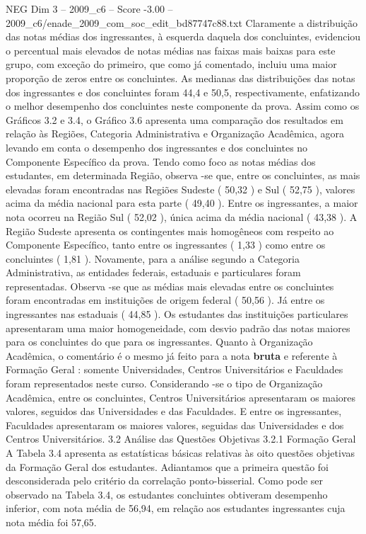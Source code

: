\begin{textsample}{NEG Dim 3 – 2009\_c6 – Score -3.00 – 2009\_c6/enade\_2009\_com\_soc\_edit\_bd87747c88.txt}
Claramente a distribuição das notas médias dos ingressantes, à esquerda daquela dos concluintes, evidenciou o percentual mais elevados de notas médias nas faixas mais baixas para este grupo, com exceção do primeiro, que como já comentado, incluiu uma maior proporção de zeros entre os concluintes.
As medianas das distribuições das notas dos ingressantes e dos concluintes foram 44,4 e 50,5, respectivamente, enfatizando o melhor desempenho dos concluintes neste componente da prova.
Assim como os Gráficos 3.2 e 3.4, o Gráfico 3.6 apresenta uma comparação dos resultados em relação às Regiões, Categoria Administrativa e Organização Acadêmica, agora levando em conta o desempenho dos ingressantes e dos concluintes no Componente Específico da prova.
Tendo como foco as notas médias dos estudantes, em determinada Região, observa -se que, entre os concluintes, as mais elevadas foram encontradas nas Regiões Sudeste ( 50,32 ) e Sul ( 52,75 ), valores acima da média nacional para esta parte ( 49,40 ).
Entre os ingressantes, a maior nota ocorreu na Região Sul ( 52,02 ), única acima da média nacional ( 43,38 ).
A Região Sudeste apresenta os contingentes mais homogêneos com respeito ao Componente Específico, tanto entre os ingressantes ( 1,33 ) como entre os concluintes ( 1,81 ).
Novamente, para a análise segundo a Categoria Administrativa, as entidades federais, estaduais e particulares foram representadas.
Observa -se que as médias mais elevadas entre os concluintes foram encontradas em instituições de origem federal ( 50,56 ).
Já entre os ingressantes nas estaduais ( 44,85 ).
Os estudantes das instituições particulares apresentaram uma maior homogeneidade, com desvio padrão das notas maiores para os concluintes do que para os ingressantes.
Quanto à Organização Acadêmica, o comentário é o mesmo já feito para a nota \textbf{bruta} e referente à Formação Geral : somente Universidades, Centros Universitários e Faculdades foram representados neste curso.
Considerando -se o tipo de Organização Acadêmica, entre os concluintes, Centros Universitários apresentaram os maiores valores, seguidos das Universidades e das Faculdades.
E entre os ingressantes, Faculdades apresentaram os maiores valores, seguidas das Universidades e dos Centros Universitários. 3.2 Análise das Questões Objetivas 3.2.1 Formação Geral A Tabela 3.4 apresenta as estatísticas básicas relativas às oito questões objetivas da Formação Geral dos estudantes.
Adiantamos que a primeira questão foi desconsiderada pelo critério da correlação ponto-bisserial.
Como pode ser observado na Tabela 3.4, os estudantes concluintes obtiveram desempenho inferior, com nota média de 56,94, em relação aos estudantes ingressantes cuja nota média foi 57,65.

\end{textsample}
